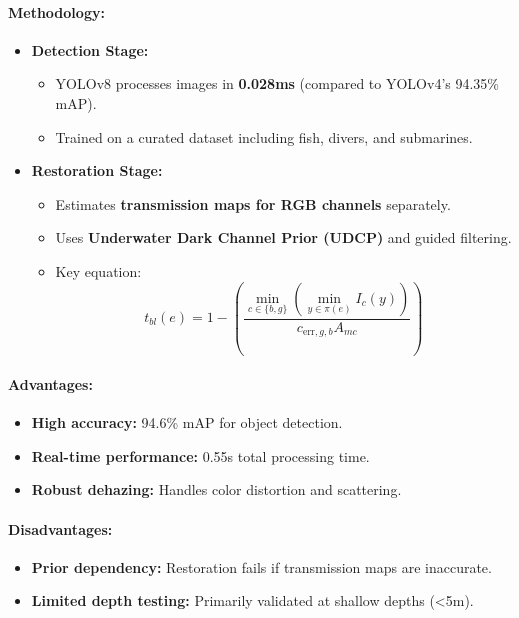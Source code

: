 \documentclass{article}
\begin{document}
\paragraph{Methodology:}
\begin{itemize}
    \item \textbf{Detection Stage:}
    \begin{itemize}
        \item YOLOv8 processes images in \textbf{0.028ms} (compared to YOLOv4’s 94.35\% mAP).
        \item Trained on a curated dataset including fish, divers, and submarines.
    \end{itemize}
    
    \item \textbf{Restoration Stage:}
    \begin{itemize}
        \item Estimates \textbf{transmission maps for RGB channels} separately.
        \item Uses \textbf{Underwater Dark Channel Prior (UDCP)} and guided filtering.
        \item Key equation:
        \[
        t_{bl}(e) = 1 - \left( \frac{\min_{c \in \{b,g\}}(\min_{y \in \pi(e)} I_c(y))}{c_{\text{err},g,b} A_{mc}} \right)
        \]
    \end{itemize}
\end{itemize}

\paragraph{Advantages:}
\begin{itemize}
    \item \textbf{High accuracy:} 94.6\% mAP for object detection.
    \item \textbf{Real-time performance:} 0.55s total processing time.
    \item \textbf{Robust dehazing:} Handles color distortion and scattering.
\end{itemize}

\paragraph{Disadvantages:}
\begin{itemize}
    \item \textbf{Prior dependency:} Restoration fails if transmission maps are inaccurate.
    \item \textbf{Limited depth testing:} Primarily validated at shallow depths (\textless5m).
\end{itemize}
\end{document}
